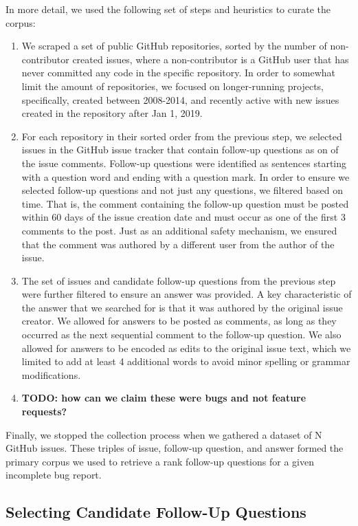 In more detail, we used the following set of steps and heuristics to curate the corpus:
\begin{enumerate}
\item We scraped a set of public GitHub repositories, sorted by the number of
non-contributor created issues, where a non-contributor is a GitHub user that has never
committed any code in the specific repository. In order to somewhat limit the amount of repositories,
we focused on longer-running projects, specifically, created between 2008-2014, and recently
active with new issues created in the repository after Jan 1, 2019.
\item For each repository in their sorted order from the previous step, we selected issues in the GitHub issue tracker
that contain follow-up questions as on of the issue comments.  Follow-up questions were identified as sentences starting with a question word and ending with a question mark. In order to ensure we selected follow-up questions and not just
any questions, we filtered based on time. That is, the comment containing the follow-up question must be posted
within 60 days of the issue creation date and must occur as one of the first 3 comments to the post. Just as an additional safety mechanism,
we ensured that the comment was authored by a different user from the author of the issue.
\item The set of issues and candidate follow-up questions from the previous step were further filtered to
ensure an answer was provided. A key characteristic of the answer that we searched for is that it was authored
by the original issue creator. We allowed for answers to be posted as comments, as long as they occurred as the next sequential comment
to the follow-up question. We also allowed for answers to be encoded as edits to the original issue text, which we limited to add at least 4 additional words to avoid minor spelling or grammar modifications.
\item {\bf TODO: how can we claim these were bugs and not feature requests?}
\end{enumerate}

Finally, we stopped the collection process when we gathered a dataset of N GitHub issues. These triples of
issue, follow-up question, and answer formed the primary corpus we used to retrieve a rank follow-up questions
for a given incomplete bug report.

\subsection{Selecting Candidate Follow-Up Questions}

